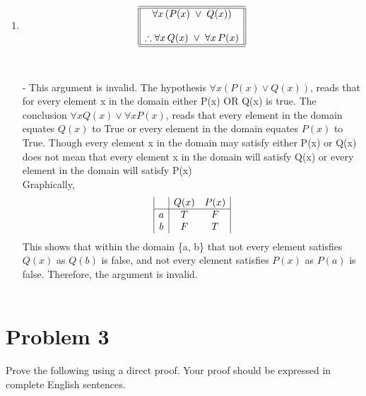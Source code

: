 \documentclass{amsart}
\theoremstyle{definition}
\theoremstyle{Exercise}
\theoremstyle{remark}
\theoremstyle{rule}
\numberwithin{equation}{section}
\begin{document}
\begin{enumerate}[label=(\alph*)]
\item \[
\begin{array}{||c||}
\hline \hline
\forall x\, (P(x)\; \lor \;Q(x) )\\
\\
\therefore \forall x\, Q(x)\; \lor \; \forall x\, P(x) \\
\hline \hline
\end{array}
\]\\\\
 - This argument is invalid. The hypothesis $\forall x (P(x) \lor Q(x))$, reads that for every element x in the domain either P(x) OR Q(x) is true. The conclusion $\forall x Q(x) \lor \forall x P(x)$, reads that every 
 element in the domain equates $Q(x)$ to True or every element in the domain equates $P(x)$ to True. Though every element x in the domain may satisfy either P(x) or Q(x) does not mean that 
 every element x in the domain will satisfy Q(x) or every element in the domain will satisfy P(x)\\
 Graphically,
 \[
 \begin{array}{|c | c c|}
   & Q(x) & P(x)\\
  \hline
  a & T & F\\
  b & F & T\\
 \end{array}
 \]
 This shows that within the domain \{a, b\} that not every element satisfies $Q(x)$ as $Q(b)$ is false, and not every element satisfies $P(x)$ as $P(a)$ is false. Therefore, the argument is invalid.
 \\\\
 \end{enumerate}
 \newpage

\vspace*{0.5in}
\section*{Problem 3}

Prove the following using a direct proof. Your proof should be expressed in complete English sentences.
\\\\
\end{document}

